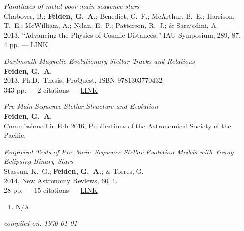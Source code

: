 \documentclass[11pt,a4paper]{article}
\begin{document}
\begin{etaremune}[leftmargin=0.30in]
    \item \emph{Parallaxes of metal-poor main-sequence stars} \\
    Chaboyer, B.; {\bf Feiden, G.~A.}; Benedict, G.~F.; McArthur, B.~E.; Harrison, T.~E.; McWilliam, A.; Nelan, E.~P.; Patterson, R.~J.; \& Sarajedini, A. \\
    2013, ``Advancing the Physics of Cosmic Distances,'' IAU Symposium, 289, 87. \\
    4 pp. --- \href{http://adsabs.harvard.edu/abs/2013IAUS..289...87C}{LINK}
\end{etaremune}

\vspace{\baselineskip}

\begin{etaremune}[leftmargin=0.30in]
	\item \emph{Dartmouth Magnetic Evolutionary Stellar Tracks and Relations} \\
		{\bf Feiden, G.~A.} \\
		2013, Ph.D.\ Thesis, ProQuest, ISBN 9781303770432. \\
		343 pp. --- 2 citations --- \href{http://adsabs.harvard.edu/abs/2013PhDT.......149F}{LINK}
\end{etaremune}

\vspace{\baselineskip}


\begin{etaremune}[leftmargin=0.30in]
	\item \emph{Pre-Main-Sequence Stellar Structure and Evolution} \\
		{\bf Feiden, G.~A.} \\
		Commissioned in Feb 2016, Publications of the Astronomical Society of the Pacific. 
		
	\item {\it Empirical Tests of Pre--Main--Sequence Stellar Evolution Models with Young Eclipsing Binary~Stars} \\
          Stassun, K.~G.; {\bf Feiden, G.~A.}; \& Torres, G. \\
          2014, New Astronomy Reviews, 60, 1. \\
          28 pp. --- 15 citations --- \href{http://adsabs.harvard.edu/abs/2014NewAR..60....1S}{LINK}
\end{etaremune}

\vspace{\baselineskip}


\begin{enumerate}
	\item[] N/A
\end{enumerate}

\vspace{\baselineskip}



\vspace{\baselineskip}

\begin{flushright}
	\emph{\footnotesize compiled on: \today}
\end{flushright}
\end{document}
